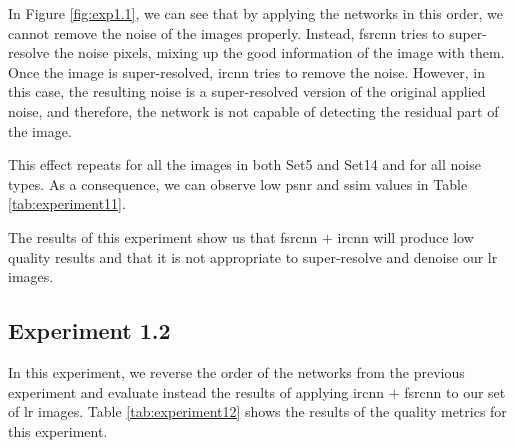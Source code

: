 In Figure \ref{fig:exp1.1}, we can see that by applying the networks in this order, we cannot remove the noise of the images properly. Instead, \gls{fsrcnn} tries to super-resolve the noise pixels, mixing up the good information of the image with them. Once the image is super-resolved, \gls{ircnn} tries to remove the noise. However, in this case, the resulting noise is a super-resolved version of the original applied noise, and therefore, the network is not capable of detecting the residual part of the image.

This effect repeats for all the images in both Set5 and Set14 and for all noise types. As a consequence, we can observe low \gls{psnr} and \gls{ssim} values in Table \ref{tab:experiment11}.

The results of this experiment show us that \gls{fsrcnn} $+$ \gls{ircnn} will produce low quality results and that it is not appropriate to super-resolve and denoise our \gls{lr} images.

\subsection{Experiment 1.2}
In this experiment, we reverse the order of the networks from the previous experiment and evaluate instead the results of applying \gls{ircnn} $+$ \gls{fsrcnn} to our set of \gls{lr} images. Table \ref{tab:experiment12} shows the results of the quality metrics for this experiment. 

